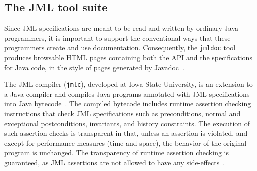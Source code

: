 \subsection{The JML tool suite}
\label{tools}

Since JML specifications are meant to be read and written by ordinary
Java programmers, it is important to support the conventional ways
that these programmers create and use documentation.  Consequently,
the {\tt jmldoc} tool
produces browsable HTML pages containing both the
API and the specifications for Java code, in the style of pages
generated by Javadoc~\cite{Friendly95}.

The JML compiler (\texttt{jmlc}), developed at Iowa State University,
is an extension to a Java compiler and compiles Java programs
annotated with JML specifications into Java
bytecode~\cite{Cheon03,Cheon-Leavens02b}.  The compiled bytecode includes
runtime assertion checking instructions that check JML specifications
such as preconditions, normal and exceptional postconditions,
invariants, and history constraints.  The execution of such assertion
checks is transparent in that, unless an assertion is violated, and
except for performance measures (time and space), the behavior of the
original program is unchanged.  The transparency of runtime assertion
checking is guaranteed, as JML assertions are not allowed to have any
side-effects~\cite{Leavens-etal03a}.


